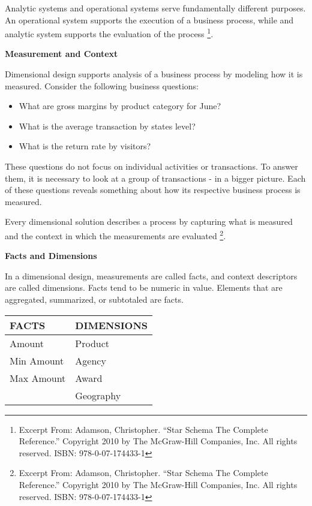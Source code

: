 \documentclass[letterpaper,10pt,oneside]{sphinxmanual}
\begin{document}
Analytic systems and operational systems serve fundamentally different purposes.
An operational system supports the execution of a business process, while and
analytic system supports the evaluation of the process \footnote[7]{\sphinxAtStartFootnote%
Excerpt From: Adamson, Christopher. “Star Schema The Complete Reference.” Copyright 2010 by The McGraw-Hill Companies, Inc. All rights reserved. ISBN: 978-0-07-174433-1
}.

\textbf{Measurement and Context}

Dimensional design supports analysis of a business process by modeling how it is
measured. Consider the following business questions:
\begin{itemize}
\item {} 
What are gross margins by product category for June?

\item {} 
What is the average transaction by states level?

\item {} 
What is the return rate by visitors?

\end{itemize}

These questions do not focus on individual activities or transactions.
To answer them, it is necessary to look at a group of transactions - in a bigger picture.
Each of these questions reveals something about how its respective business process is measured.

Every dimensional solution describes a process by capturing what is measured and the context in which the measurements are evaluated \footnote[8]{\sphinxAtStartFootnote%
Excerpt From: Adamson, Christopher. “Star Schema The Complete Reference.” Copyright 2010 by The McGraw-Hill Companies, Inc. All rights reserved. ISBN: 978-0-07-174433-1
}.

\textbf{Facts and Dimensions}

In a dimensional design, measurements are called facts, and context descriptors are called dimensions.
Facts tend to be numeric in value. Elements that are aggregated, summarized, or subtotaled are facts.

\begin{tabulary}{\linewidth}{|L|L|}
\hline

\textbf{FACTS}
 & 
\textbf{DIMENSIONS}
\\
\hline
Amount
 & 
Product
\\
\hline
Min Amount
 & 
Agency
\\
\hline
Max Amount
 & 
Award
\\
\hline & 
Geography
\\
\hline\end{tabulary}
\end{document}
